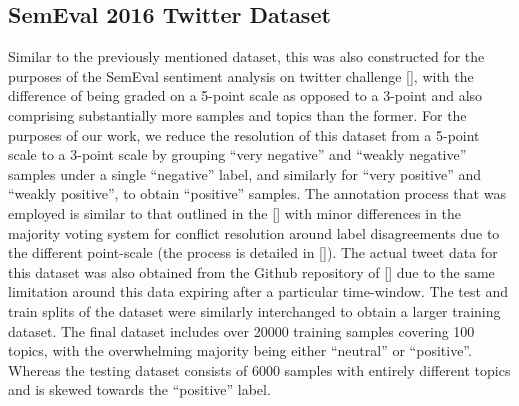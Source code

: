 \documentclass[12pt, a4paper]{report}
\theoremstyle{definition}
\theoremstyle{definition}%
\theoremstyle{definition}%
\theoremstyle{definition}%
\theoremstyle{definition}%
\theoremstyle{definition}%
\renewcommand{\cite}[1]{[\citealp{#1}]}
\begin{document}
\subsection{SemEval 2016 Twitter Dataset}
Similar to the previously mentioned dataset, this was also constructed for the purposes of the SemEval sentiment analysis on twitter challenge \cite{nakov2016}, with the difference of being graded on a 5-point scale as opposed to a 3-point and also comprising substantially more samples and topics than the former. For the purposes of our work, we reduce the resolution of this dataset from a 5-point scale to a 3-point scale by grouping \enquote{very negative} and \enquote{weakly negative} samples under a single \enquote{negative} label, and similarly for \enquote{very positive} and \enquote{weakly positive}, to obtain \enquote{positive} samples. The annotation process that was employed is similar to that outlined in the \cite{rosenthal2015} with minor differences in the majority voting system for conflict resolution around label disagreements due to the different point-scale (the process is detailed in \cite{nakov2016}). The actual tweet data for this dataset was also obtained from the Github repository of \cite{baziotis2017} due to the same limitation around this data expiring after a particular time-window. The test and train splits of the dataset were similarly interchanged to obtain a larger training dataset. The final dataset includes over 20000 training samples covering 100 topics, with the overwhelming majority being either \enquote{neutral} or \enquote{positive}. Whereas the testing dataset consists of 6000 samples with entirely different topics and is skewed towards the \enquote{positive} label.
\end{document}
